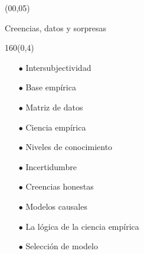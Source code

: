 \documentclass[shownotes,aspectratio=169]{beamer}
\newif\ifen
\newif\ifes
\newcommand{\en}[1]{\ifen#1\fi}
\newcommand{\es}[1]{\ifes#1\fi}
\begin{document}
\color{black!85}
\large

 

\begin{frame}
 
 \begin{textblock}{90}(00,05)
\begin{center}
 \huge  \textcolor{black!66}{Creencias, datos y sorpresas}
\end{center}
\end{textblock}

{}
\end{frame}


\begin{frame}[plain]
\begin{textblock}{160}(0,4)
 \centering
 \LARGE \textcolor{black!85}{\en{Today}}
\end{textblock}

\begin{itemize}
 \item[$\bullet$] Intersubjectividad
 \item[$\bullet$] Base empírica 
 \item[$\bullet$] Matriz de datos 
 \item[$\bullet$] Ciencia empírica 
 \item[$\bullet$] Niveles de conocimiento
 \item[$\bullet$] Incertidumbre
 \item[$\bullet$] Creencias honestas
 \item[$\bullet$] Modelos causales
 \item[$\bullet$] La lógica de la ciencia empírica
 \item[$\bullet$] Selección de modelo
\end{itemize}


\end{frame}
\end{document}
